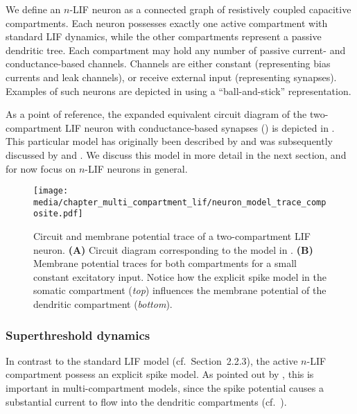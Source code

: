 We define an $n$-LIF neuron as a connected graph of resistively coupled capacitive compartments.
Each neuron possesses exactly one active compartment with standard LIF dynamics, while the other compartments represent a passive dendritic tree.
Each compartment may hold any number of passive current- and conductance-based channels.
Channels are either constant (representing bias currents and leak channels), or receive external input (representing synapses).
Examples of such neurons are depicted in  using a \enquote{ball-and-stick} representation.

As a point of reference, the expanded equivalent circuit diagram of the two-compartment LIF neuron with conductance-based synapses () is depicted in .
This particular model has originally been described by \citet{vu1993mechanism} and was subsequently discussed by \citet{koch1999biophysics} and \citet{capaday2006direct}.
We discuss this model in more detail in the next section, and for now focus on $n$-LIF neurons in general.

\begin{figure}
	\texttt{[image: media/chapter\_multi\_compartment\_lif/neuron\_model\_trace\_composite.pdf]}%
	{\label{fig:two_comp_lif_circuit}}
	{\label{fig:two_comp_lif_trace}}
	\caption[Circuit and membrane potential trace of a two-compartment LIF neuron]{Circuit and membrane potential trace of a two-compartment LIF neuron.
	\textbf{(A)} Circuit diagram corresponding to the model in .
	\textbf{(B)} Membrane potential traces for both compartments for a small constant excitatory input.
	Notice how the explicit spike model in the somatic compartment (\emph{top}) influences the membrane potential of the dendritic compartment (\emph{bottom}).}
	\label{fig:two_comp_lif}
\end{figure}

\subsubsection{Superthreshold dynamics}
In contrast to the standard LIF model (cf.~Section~2.2.3), the active $n$-LIF compartment possess an explicit spike model.
As pointed out by \citet{capaday2006direct}, this is important in multi-compartment models, since the spike potential causes a substantial current to flow into the dendritic compartments (cf.~).

